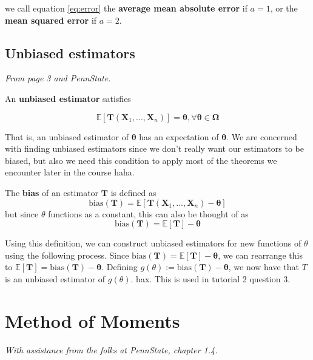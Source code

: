 we call equation \ref{eq:error} the \textbf{average mean absolute error} if \(a = 1\), or the \textbf{mean squared error} if \(a=2\).

\subsection{Unbiased estimators}\label{sec:unbiased ests}

\textit{From page 3 and PennState. \autocite{penn415}}

An \textbf{unbiased estimator} satisfies 

\begin{equation}\label{eq:unbiased cond}
    \mathbb{E}[\bm{T}(\bm{X}_1, ..., \bm{X}_n)] = \bm{\theta}, \forall \bm{\theta}\in\bm{\Omega}
\end{equation}

That is, an unbiased estimator of \(\bm{\theta}\) has an expectation of \(\bm{\theta}\). 
We are concerned with finding unbiased estimators since we don't really want our estimators to be biased, but also we
need this condition to apply most of the theorems we encounter later in the course haha.

\begin{definition}\label{defn:bias}
    The \textbf{bias} of an estimator \(\bm{T}\) is defined as
    \begin{equation}\label{eq:bias}
        \text{bias}(\bm{T}) = \mathbb{E}[\bm{T}(\bm{X}_1, ..., \bm{X}_n) - \bm{\theta}]
    \end{equation}
    but since \(\theta\) functions as a constant, this can also be thought of as 
    \[\text{bias}(\bm{T}) = \mathbb{E}[\bm{T}] - \bm{\theta}\]
\end{definition}

Using this definition, we can construct unbiased estimators for new functions of \(\theta\) using the following process. 
Since \(\text{bias}(\bm{T}) = \mathbb{E}[\bm{T}] - \bm{\theta}\), we can rearrange this to \(\mathbb{E}[\bm{T}] = \text{bias}(\bm{T}) - \bm{\theta}\). 
Defining \(g(\theta):= \text{bias}(\bm{T}) - \bm{\theta}\), we now have that \(T\) is an unbiased estimator of \(g(\theta)\). 
hax. This is used in tutorial 2 question 3.

\section{Method of Moments}\label{sec:method of moments}

\textit{With assistance from the folks at PennState, chapter 1.4.\autocite{penn415}}

